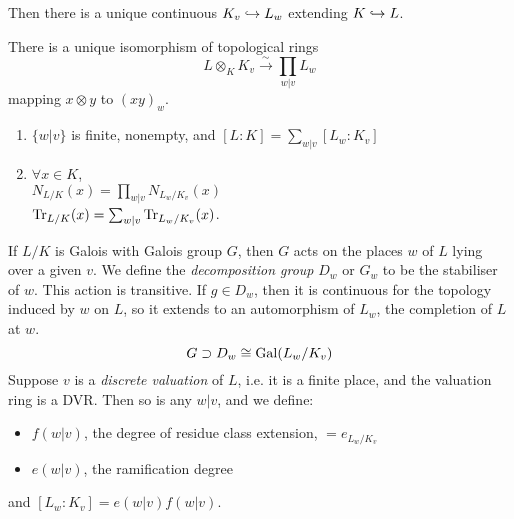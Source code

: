\documentclass[10pt,a4paper]{article}
\begin{document}
Then there is a unique continuous $K_v\hookrightarrow L_w$ extending $K \hookrightarrow L$.
\begin{proposition}
  There is a unique isomorphism of topological rings
  \[L \otimes_K K_v \xrightarrow{\sim} \prod_{w|v}L_w\]
  mapping $x \otimes y$ to $(xy)_w$.
\end{proposition}
\begin{corollary}\hspace*{0cm}
  \begin{enumerate}
    \item $\{w|v\}$ is finite, nonempty, and $[L:K] = \sum_{w|v} [L_w:K_v]$
    \item $\forall x \in K$, \\$N_{L/K}(x) = \prod_{w|v}N_{L_w/K_v}(x)$\\
    $\operatorname{Tr}_{L/K}(x) = \sum_{w|v}\operatorname{Tr}_{L_w/K_v}(x)$.
  \end{enumerate}
\end{corollary}
If $L/K$ is Galois with Galois group $G$, then $G$ acts on the places $w$ of $L$ lying over a given $v$. We define the \emph{decomposition group} $D_w$ or $G_w$ to be the stabiliser of $w$. This action is transitive. If $g \in D_w$, then it is continuous for the topology induced by $w$ on $L$, so it extends to an automorphism of $L_w$, the completion of $L$ at $w$.
\[G \supset D_w \cong \operatorname{Gal}(L_w/K_v)\]
Suppose $v$ is a \emph{discrete valuation} of $L$, i.e. it is a finite place, and the valuation ring is a DVR. Then so is any $w|v$, and we define:
\begin{itemize}
  \item $f(w|v)$, the degree of residue class extension, $= e_{L_w/K_v}$
  \item $e(w|v)$, the ramification degree
\end{itemize}
and $[L_w:K_v] = e(w|v)f(w|v)$.
\end{document}
